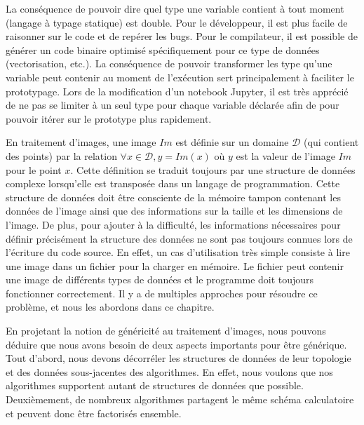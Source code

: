 La conséquence de pouvoir dire quel type une variable contient à tout moment (langage à typage statique) est double.
Pour le développeur, il est plus facile de raisonner sur le code et de repérer les bugs. Pour le compilateur, il est
possible de générer un code binaire optimisé spécifiquement pour ce type de données (vectorisation, etc.). La
conséquence de pouvoir transformer les type qu'une variable peut contenir au moment de l'exécution sert principalement à
faciliter le prototypage. Lors de la modification d'un notebook Jupyter, il est très apprécié de ne pas se limiter à un
seul type pour chaque variable déclarée afin de pour pouvoir itérer sur le prototype plus rapidement.

En traitement d'images, une image \(Im\) est définie sur un domaine \(\mathcal{D}\) (qui contient des points) par la
relation \(\forall x \in \mathcal{D}, y = Im(x)\) où \(y\) est la valeur de l'image \(Im\) pour le point \(x\). Cette
définition se traduit toujours par une structure de données complexe lorsqu'elle est transposée dans un langage de
programmation. Cette structure de données doit être consciente de la mémoire tampon contenant les données de l'image
ainsi que des informations sur la taille et les dimensions de l'image. De plus, pour ajouter à la difficulté, les
informations nécessaires pour définir précisément la structure des données ne sont pas toujours connues lors de
l'écriture du code source. En effet, un cas d'utilisation très simple consiste à lire une image dans un fichier pour la
charger en mémoire. Le fichier peut contenir une image de différents types de données et le programme doit toujours
fonctionner correctement. Il y a de multiples approches pour résoudre ce problème, et nous les abordons dans ce
chapitre.

En projetant la notion de généricité au traitement d'images, nous pouvons déduire que nous avons besoin de deux aspects
importants pour être générique. Tout d'abord, nous devons décorréler les structures de données de leur topologie et des
données sous-jacentes des algorithmes. En effet, nous voulons que nos algorithmes supportent autant de structures de
données que possible. Deuxièmement, de nombreux algorithmes partagent le même schéma calculatoire et peuvent donc être
factorisés ensemble.

